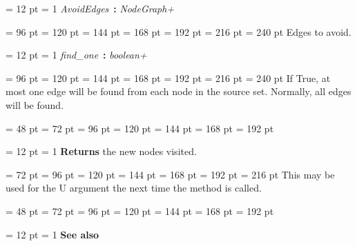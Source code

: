 {{{{{{{{\par \pagebreak[3.000000] \noindent \hangindent = 12 pt \hangafter = 1 
{\em AvoidEdges\/}~{\bf :}  {\em NodeGraph+\/}\par}
{\par \noindent  \leftskip = 96 pt  \leftmargini = 120 pt  \leftmarginii = 144 pt  \leftmarginiii = 168 pt  \leftmarginiv = 192 pt  \leftmarginv = 216 pt  \leftmarginvi = 240 pt  Edges to avoid.
\par}
{\par \pagebreak[3.000000] \noindent \hangindent = 12 pt \hangafter = 1 
{\em find{\_}one\/}~{\bf :}  {\em boolean+\/}\par}
{\par \noindent  \leftskip = 96 pt  \leftmargini = 120 pt  \leftmarginii = 144 pt  \leftmarginiii = 168 pt  \leftmarginiv = 192 pt  \leftmarginv = 216 pt  \leftmarginvi = 240 pt  If True, at most one edge will be found from each node
         in the source set. Normally, all edges will be found.
\par}
\par}
\par}
\par}
\par}
{\par \noindent  \leftskip = 48 pt  \leftmargini = 72 pt  \leftmarginii = 96 pt  \leftmarginiii = 120 pt  \leftmarginiv = 144 pt  \leftmarginv = 168 pt  \leftmarginvi = 192 pt {\par \noindent
{\par \pagebreak[3.100000] \noindent \hangindent = 12 pt \hangafter = 1 
{\bf Returns \/} the new nodes visited.\par}
{\par \noindent  \leftskip = 72 pt  \leftmargini = 96 pt  \leftmarginii = 120 pt  \leftmarginiii = 144 pt  \leftmarginiv = 168 pt  \leftmarginv = 192 pt  \leftmarginvi = 216 pt  This may be used for the U argument the next time the method is called.
\par}
\par}
\par}
{\par \noindent  \leftskip = 48 pt  \leftmargini = 72 pt  \leftmarginii = 96 pt  \leftmarginiii = 120 pt  \leftmarginiv = 144 pt  \leftmarginv = 168 pt  \leftmarginvi = 192 pt {\par \noindent
{\par \pagebreak[3.100000] \noindent \hangindent = 12 pt \hangafter = 1 
{\bf See also\/}\par}
}}}}}
